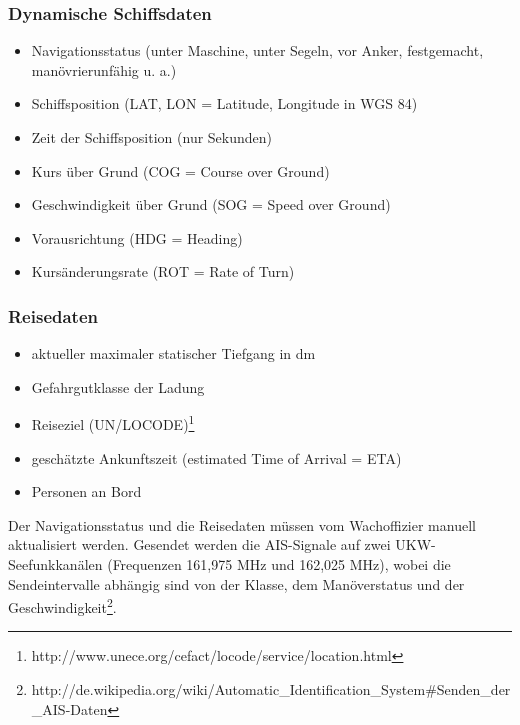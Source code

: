 \subsubsection{Dynamische Schiffsdaten} \label{Dynamische Schiffsdaten}
\begin{itemize}
\item Navigationsstatus (unter Maschine, unter Segeln, vor Anker, festgemacht, manövrierunfähig u. a.)
\item Schiffsposition (LAT, LON = Latitude, Longitude in WGS 84)
\item Zeit der Schiffsposition (nur Sekunden)
\item Kurs über Grund (COG = Course over Ground)
\item Geschwindigkeit über Grund (SOG = Speed over Ground)
\item Vorausrichtung (HDG = Heading)
\item Kursänderungsrate (ROT = Rate of Turn)
\end{itemize}

\subsubsection{Reisedaten} \label{Reisedaten}
\begin{itemize}
\item aktueller maximaler statischer Tiefgang in dm
\item Gefahrgutklasse der Ladung
\item Reiseziel (UN/LOCODE)\footnote{http://www.unece.org/cefact/locode/service/location.html}
\item geschätzte Ankunftszeit (estimated Time of Arrival = ETA)
\item Personen an Bord
\end{itemize}

Der Navigationsstatus und die Reisedaten müssen vom Wachoffizier manuell aktualisiert werden. Gesendet werden die AIS-Signale auf zwei UKW-Seefunkkanälen (Frequenzen 161,975 MHz und 162,025 MHz), wobei die Sendeintervalle abhängig sind von der Klasse, dem Manöverstatus und der Geschwindigkeit\footnote{http://de.wikipedia.org/wiki/Automatic\_Identification\_System\#Senden\_der\_AIS-Daten}.

